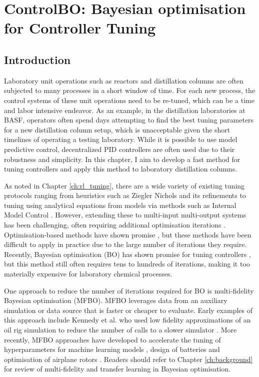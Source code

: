 \chapter{ControlBO: Bayesian optimisation for Controller Tuning}\label{ch:mfbo} 

\section{Introduction}
\label{sec:intro}
Laboratory unit operations such as reactors and distillation columns  are often subjected to many processes in a short window of time. For each new process, the control systems of these unit operations need to be re-tuned, which can be a time and labor intensive endeavor. As an example, in the distillation laboratories at BASF, operators often spend days attempting to find the best tuning parameters for a new distillation column setup, which is unacceptable given the short timelines of operating a testing laboratory. While it is possible to use model predictive control, decentralized PID controllers are often used due to their robustness and simplicity. In this chapter, I aim to develop a fast method for tuning controllers and apply this method to laboratory distillation columns.

As noted in Chapter \ref{ch:rl_tuning}, there are a wide variety of existing tuning protocols ranging from heuristics such as Ziegler Nichols \cite{Ziegler1942} and its refinements \cite{Hang1991} to tuning using analytical equations from models via methods such as  Internal Model Control \cite{Copeland2010}. However, extending these to multi-input multi-output systems has been challenging, often requiring additional optimisation iterations \cite{Nandong2013, Nandong2015}. Optimisation-based methods have shown promise \cite{Pajares2019, Sumana2010, Rajapandiyan2012, Behroozsarand2012}, but these methods have been difficult to apply in practice due to the large number of iterations they require. Recently, Bayesian optimisation (BO) has shown promise for tuning controllers \cite{NeumannBrosig2020, Fiducioso2019, Khosravi2020, Konig2020, Fujimoto2022, Brunzema2022, Khosravi2022}, but this method still often requires tens to hundreds of iterations, making it too materially expensive for laboratory chemical processes.

One approach to reduce the number of iterations required for BO is multi-fidelity Bayesian optimisation (MFBO). MFBO leverages data from an auxiliary simulation or data source that is faster or cheaper to evaluate. Early examples of this approach include Kennedy et al. who used low fidelity approximations of an oil rig simulation to reduce the number of calls to a slower simulator \cite{Kennedy2000}. More recently, MFBO approaches have developed to accelerate the tuning of hyperparameters for machine learning models \cite{pmlr-v70-kandasamy17a}, design of batteries \cite{Folch2023} and optimisation of airplane rotors \cite{Pan2017}. Readers should refer to Chapter \ref{ch:background} for review of multi-fidelity and transfer learning in Bayesian optimisation.

